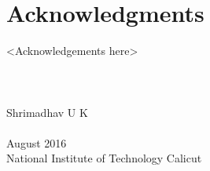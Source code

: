 \cleardoublepage
{}
{}
\chapter*{Acknowledgments}
\vspace{1.0in}
<Acknowledgements here>
\\
\\
\\ 
\\
Shrimadhav U K \\ 
\\
August 2016\\
{National Institute of Technology Calicut}\\
\newpage
